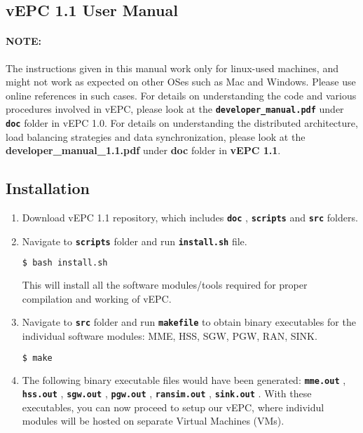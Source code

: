 \pdfminorversion=4\documentclass[hidelinks]{report}
\newcommand{\cf}[1] {
	\textbf{\texttt{#1}}
}
\begin{document}

\begin{center}
\section*{vEPC 1.1 User Manual}
\end{center}

\paragraph*{NOTE:}

The instructions given in this manual work only for linux-used machines, and might not work as expected on other OSes such as Mac and Windows. Please use online references in such cases. For details on understanding the code and various procedures involved in vEPC, please look at the \cf{developer\_manual.pdf} under \cf{doc} folder in vEPC 1.0. For details on understanding the distributed architecture, load balancing strategies and data synchronization, please look at the \textbf{developer\_manual\_1.1.pdf} under \textbf{doc} folder in \textbf{vEPC 1.1}.
\subsection*{Installation}

\begin{enumerate}

\item Download vEPC 1.1 repository, which includes \cf{doc}, \cf{scripts} and \cf{src} folders.

\item Navigate to \cf{scripts} folder and run \cf{install.sh} file.

\begin{lstlisting}[language=bash]
$ bash install.sh
\end{lstlisting}

This will install all the software modules/tools required for proper compilation and working of vEPC.

\item Navigate to \cf{src} folder and run \cf{makefile} to obtain binary executables for the individual software modules: MME, HSS, SGW, PGW, RAN, SINK.

\begin{lstlisting}[language=bash]
$ make
\end{lstlisting}

\item The following binary executable files would have been generated: \cf{mme.out}, \cf{hss.out}, \cf{sgw.out}, \cf{pgw.out}, \cf{ransim.out}, \cf{sink.out}. With these executables, you can now proceed to setup our vEPC, where individul modules will be hosted on separate Virtual Machines (VMs).

\end{enumerate}
\end{document}
